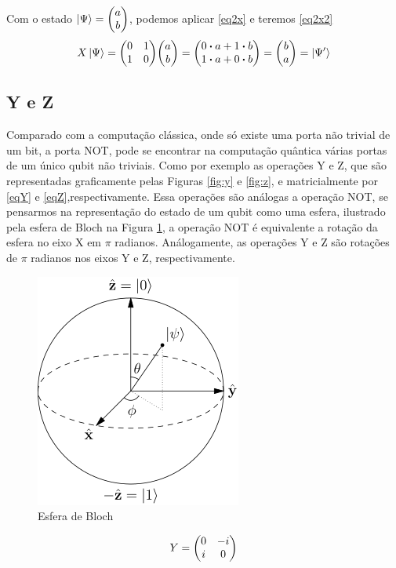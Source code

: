 \documentclass[a4paper, 12pt, oneside]{book}
\begin{document}
Com o estado $\ket{\Psi} = \mqty(a\\b)$, podemos aplicar \eqref{eq2x} e teremos \eqref{eq2x2}
\begin{equation}\label{eq2x2}
X\ket{\Psi} = \mqty(0&1\\1&0)\mqty(a\\b) = \mqty(0 \vdot a+1 \vdot b \\1 \vdot a+0 \vdot b) = \mqty(b\\a) = \ket{\Psi'}
\end{equation}

\subsection{Y e Z} 
Comparado com a computação clássica, onde só existe uma porta não trivial de um bit, a porta NOT, pode se encontrar na computação quântica várias portas de um único qubit não triviais. Como por exemplo as operações Y e Z, que são representadas graficamente pelas Figuras \ref{fig:y} e \ref{fig:z}, e matricialmente por \eqref{eqY} e \eqref{eqZ},respectivamente. Essa operações são análogas a operação NOT, se pensarmos na representação do estado de um qubit como uma esfera, ilustrado pela esfera de Bloch na Figura \ref{fig:bloch}, a operação NOT é equivalente a rotação da esfera no eixo X em $\pi$ radianos. Análogamente, as operações Y e Z são rotações de $\pi$ radianos nos eixos Y e Z, respectivamente.

\begin{figure}[H]
\centering
\includegraphics[scale=0.5]{bloch_sphere.png}
\caption{Esfera de Bloch}
\label{fig:bloch}
\end{figure}
\begin{equation}\label{eqY}
Y =  \mqty(0&-i\\i&0)
\end{equation}
\end{document}
